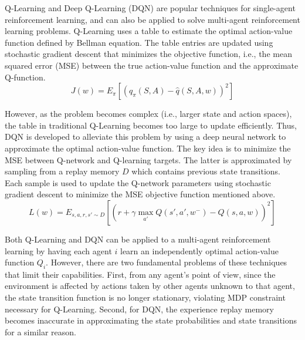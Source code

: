 Q-Learning and Deep Q-Learning (DQN) are popular techniques for single-agent
reinforcement learning, and can also be applied to solve multi-agent
reinforcement learning problems. Q-Learning uses a table to estimate the
optimal action-value function defined by Bellman equation. The table entries
are updated using stochastic gradient descent that minimizes the objective
function, i.e., the mean squared error (MSE) between the true action-value
function and the approximate Q-function.
\begin{equation}
J(w) = E_\pi[(q_\pi(S,A) - \hat q(S,A,w))^2]
\end{equation}
	

However, as the problem becomes complex (i.e., larger state and action
spaces), the table in traditional Q-Learning becomes too large to update
efficiently. Thus, DQN is developed to alleviate this problem by using a deep
neural network to approximate the optimal action-value function. The key idea
is to minimize the MSE between Q-network and Q-learning targets. The latter is
approximated by sampling from a replay memory $D$ which contains previous
state transitions. Each sample is used to update the Q-network parameters
using stochastic gradient descent to minimize the MSE objective function
mentioned above.
\begin{equation}
L(w) = E_{s,a,r,s'\sim D} [(r + \gamma \max_{a'} Q(s',a',w^-) - Q(s,a,w))^2]
\end{equation}

Both Q-Learning and DQN can be applied to a multi-agent reinforcement learning
by having each agent $i$ learn an independently optimal action-value function
$Q_i$. However, there are two fundamental problems of these techniques that
limit their capabilities. First, from any agent's point of view, since the
environment is affected by actions taken by other agents unknown to that
agent, the state transition function is no longer stationary, violating MDP
constraint necessary for Q-Learning. Second, for DQN, the experience replay
memory becomes inaccurate in approximating the state probabilities and state
transitions for a similar reason.


